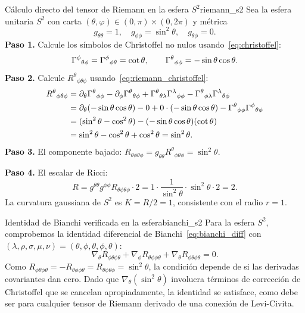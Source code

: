 \begin{ejemplo}{Cálculo directo del tensor de Riemann en la esfera $S^2$}{riemann_s2}
Sea la esfera unitaria $S^2$ con carta $(θ, φ) \in (0,\pi) \times (0,2\pi)$ y métrica
\[
  g_{\theta\theta} = 1,\quad g_{\phi\phi} = \sin^2\theta,\quad g_{\theta\phi} = 0.
\]
\textbf{Paso 1.} Calcule los símbolos de Christoffel no nulos usando~\eqref{eq:christoffel}:
\[
  \Gamma^{\phi}{}_{\theta \phi} = \Gamma^{\phi}{}_{\phi \theta} = \cot\theta,
  \qquad
  \Gamma^{\theta}{}_{\phi \phi} = -\sin\theta\cos\theta.
\]
\textbf{Paso 2.} Calcule $R^\theta{}_{\phi\theta\phi}$ usando~\eqref{eq:riemann_christoffel}:
\begin{align*}
  R^\theta{}_{\phi\theta\phi}
  &= \partial_\theta\Gamma^{\theta}{}_{\phi \phi} - \partial_\phi\Gamma^{\theta}{}_{\theta \phi}
     + \Gamma^{\theta}{}_{\theta \lambda}\Gamma^{\lambda}{}_{\phi \phi}
     - \Gamma^{\theta}{}_{\phi \lambda}\Gamma^{\lambda}{}_{\theta \phi}\\
  &= \partial_\theta(-\sin\theta\cos\theta) - 0
     + 0 \cdot(-\sin\theta\cos\theta)
     - \Gamma^{\theta}{}_{\phi \phi}\Gamma^{\phi}{}_{\theta \phi}\\
  &= (\sin^2\theta - \cos^2\theta) - (-\sin\theta\cos\theta)(\cot\theta)\\
  &= \sin^2\theta - \cos^2\theta + \cos^2\theta
  = \sin^2\theta.
\end{align*}
\textbf{Paso 3.} El componente bajado: $R_{\theta\phi\theta\phi} = g_{\theta\theta}R^\theta{}_{\phi\theta\phi} = \sin^2\theta$.

\textbf{Paso 4.} El escalar de Ricci:
\[
  R = g^{\theta\theta}g^{\phi\phi} R_{\theta\phi\theta\phi} \cdot 2
  = 1 \cdot \frac{1}{\sin^2\theta} \cdot \sin^2\theta \cdot 2 = 2.
\]
La curvatura gaussiana de $S^2$ es $K = R/2 = 1$, consistente con el radio $r = 1$.
\end{ejemplo}

\begin{ejemplo}{Identidad de Bianchi verificada en la esfera}{bianchi_s2}
Para la esfera $S^2$, comprobemos la identidad diferencial de Bianchi~\eqref{eq:bianchi_diff} con $(\lambda,\rho,\sigma,\mu,\nu) = (\theta,\phi,\theta,\phi,\theta)$:
\[
  \nabla_\theta R_{\phi\theta\phi\theta}
  + \nabla_\phi R_{\theta\phi\phi\theta}
  + \nabla_\theta R_{\phi\theta\phi\theta} = 0.
\]
Como $R_{\phi\theta\phi\theta} = -R_{\theta\phi\phi\theta} = R_{\theta\phi\theta\phi} = \sin^2\theta$, la condición depende de si las derivadas covariantes dan cero. Dado que $\nabla_\theta(\sin^2\theta)$ involucra términos de corrección de Christoffel que se cancelan apropiadamente, la identidad se satisface, como debe ser para cualquier tensor de Riemann derivado de una conexión de Levi-Civita.
\end{ejemplo}

